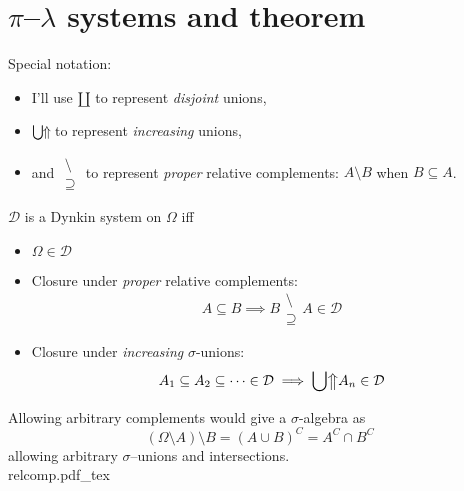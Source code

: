 \documentclass{scrartcl}
\newcommand{\measpace}{\Omega}
\newcommand{\system}{\mathcal D}
\newcommand{\propersetminus}{\begin{smallmatrix} \setminus\\\supseteq \end{smallmatrix}}%
\newcommand{\disjunion}{\mathbin{\amalg}}
\newcommand{\figinput}[1]{{#1}}
\begin{document}
\section{\(\pi\)--\(\lambda\) systems and theorem}
Special notation:
\begin{itemize}
\item I'll use \(\disjunion\) to represent \emph{disjoint} unions,
\item  \(\upunion\) to
  represent \emph{increasing} unions,
\item and \(\propersetminus\) to represent
  \emph{proper} relative complements: \(A\setminus B\) when \(B\subseteq A\).
\end{itemize}
\begin{defn} \label{original dynkin system def}
  \(\system\) is a Dynkin system on \(\measpace\) iff
  \begin{itemize}
  \item \(\measpace\in\system\)
  \item Closure under \emph{proper} relative complements:
    \[
      A\subseteq B \implies B\propersetminus A \in \system
    \]
  \item  Closure under \emph{increasing} \(\sigma\)-unions:
    \[
      A_1\subseteq A_2 \subseteq \dots \in \system \implies \upunion A_n \in \system
    \]
  \end{itemize}
\end{defn}
Allowing arbitrary complements would give a \(\sigma\)-algebra as
\[
  (\measpace\setminus A)\setminus B = (A\cup B)^C = A^C \cap B^C
\]
allowing arbitrary \(\sigma\)--unions and intersections. \\
\figinput{relcomp.pdf_tex}
\end{document}
